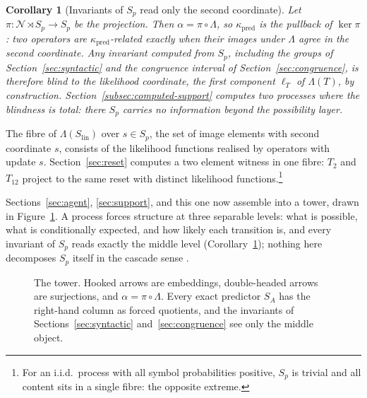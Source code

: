 \documentclass[10pt]{article}
\newtheorem{corollary}[theorem]{Corollary}
\theoremstyle{definition}
\theoremstyle{remark}
\begin{document}
\begin{corollary}[Invariants of $S_p$ read only the second coordinate]
\label{cor:projection}
Let $\pi:\mathcal N\rtimes S_p\to S_p$ be the projection.  Then
$\alpha=\pi\circ\Lambda$, so $\kappa_{\mathrm{pred}}$ is the pullback of
$\ker\pi$: two operators are $\kappa_{\mathrm{pred}}$-related exactly
when their images under $\Lambda$ agree in the second coordinate.  Any
invariant computed from $S_p$, including the groups of
Section~\ref{sec:syntactic} and the congruence interval of
Section~\ref{sec:congruence}, is therefore blind to the
likelihood coordinate, the first component $\ell_T$ of $\Lambda(T)$,
by construction.
Section~\ref{subsec:computed-support} computes two processes where the
blindness is total: there $S_p$ carries no information beyond the
possibility layer.
\end{corollary}

The fibre of $\Lambda(S_{\mathrm{lin}})$ over $s\in S_p$, the set of
image elements with second coordinate $s$, consists of the likelihood
functions realised by operators with update $s$.
Section~\ref{sec:reset} computes a two element witness in one fibre:
$T_2$ and $T_{12}$ project to the same reset with distinct likelihood
functions.\footnote{For an i.i.d.\ process with all symbol
probabilities positive, $S_p$ is trivial and all content sits in a
single fibre: the opposite extreme.}

Sections~\ref{sec:agent}, \ref{sec:support}, and this one now assemble
into a tower, drawn in Figure~\ref{fig:tower}.  A process forces structure at three
separable levels: what is possible, what is conditionally expected,
and how likely each transition is, and every invariant of $S_p$ reads
exactly the middle level (Corollary~\ref{cor:projection}); nothing here
decomposes $S_p$ itself in the cascade sense \cite{DrosteEtAl2011}.

\begin{figure}[ht]
\centering
{}
\caption{The tower.  Hooked arrows are embeddings, double-headed
arrows are surjections, and $\alpha=\pi\circ\Lambda$.  Every exact
predictor $S_A$ has the right-hand column as forced quotients, and
the invariants of Sections~\ref{sec:syntactic} and~\ref{sec:congruence}
see only the middle object.}
\label{fig:tower}
\end{figure}
\end{document}
